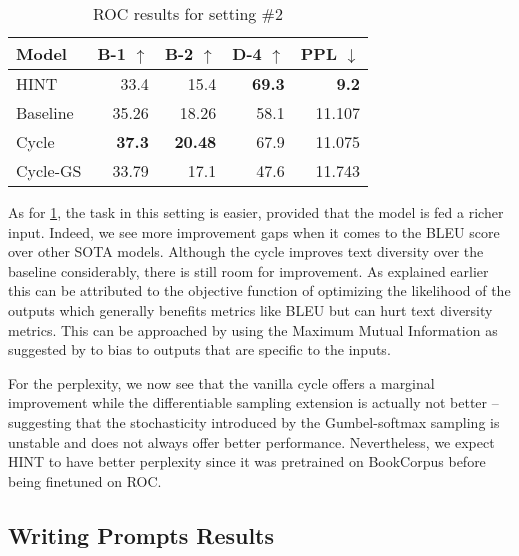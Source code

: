 \begin{table}[ht]
\centering
\begin{tabular}{l|rr|r|r}
Model & B-1 $\uparrow$ & B-2 $\uparrow$ & D-4 $\uparrow$ & PPL $\downarrow$  \\ \hline
HINT & 33.4 & 15.4 & \textbf{69.3} & \textbf{9.2} \\ \hline
Baseline & 35.26 & 18.26 & 58.1 & 11.107 \\
Cycle & \textbf{37.3} & \textbf{20.48} & 67.9 & 11.075 \\
Cycle-GS & 33.79 & 17.1 & 47.6 & 11.743
\end{tabular}
\caption{ROC results for setting \#2}
\label{table:roc_2_results}
\end{table}

As for \cref{table:roc_2_results}, the task in this setting is easier, provided that the model is fed a richer input. Indeed, we see more improvement gaps when it comes to the BLEU score over other SOTA models. Although the cycle improves text diversity over the baseline considerably, there is still room for improvement. As explained earlier this can be attributed to the objective function of optimizing the likelihood of the outputs which generally benefits metrics like BLEU but can hurt text diversity metrics. This can be approached by using the Maximum Mutual Information as suggested by \citep{li2015diversity} to bias to outputs that are specific to the inputs.

For the perplexity, we now see that the vanilla cycle offers a marginal improvement while the differentiable sampling extension is actually not better -- suggesting that the stochasticity introduced by the Gumbel-softmax sampling is unstable and does not always offer better performance. Nevertheless, we expect HINT to have better perplexity since it was pretrained on BookCorpus \citep{zhu2015aligning} before being finetuned on ROC.


\subsection{Writing Prompts Results}
\label{sec:wp_results}

